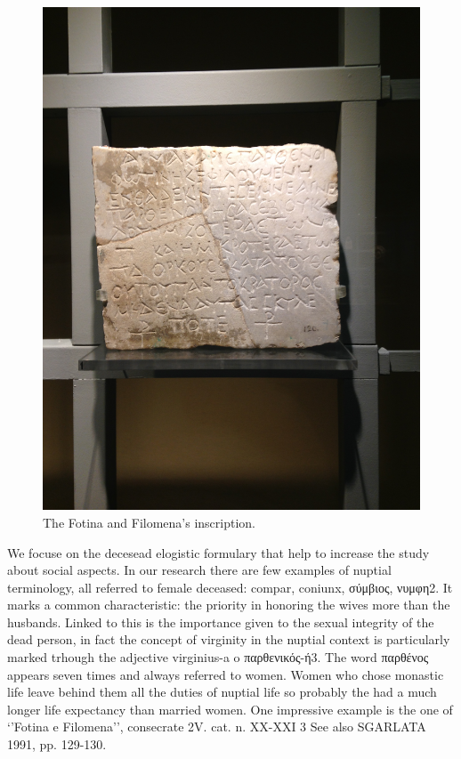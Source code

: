 \documentclass[amsthm,ebook]{saparticle}
\begin{document}
\begin{figure}[hbp]
\centering
 \includegraphics[width=\columnwidth]{Fotina e Filomena.JPG}
\caption{The Fotina and Filomena’s inscription.}
\label{fig:4}
\end{figure}


We focuse on the decesead elogistic formulary that help to increase the study about social aspects. In our research there are few examples of nuptial terminology, all referred to female deceased: compar, coniunx, σύμβιος, νυμφη2. It marks a common characteristic: the priority in honoring the wives more than the husbands. Linked to this is the importance given to the sexual integrity of the dead person, in fact the concept of virginity in the nuptial context is particularly marked trhough the adjective virginius-a o παρθενικός-ή3. The word παρθένος appears seven times and always referred to women. Women who chose monastic life leave behind them all the duties of nuptial life so probably the had a much longer life expectancy than married women. One impressive example is the one of ‘’Fotina e Filomena’’, consecrate
2V. cat. n. XX-XXI
3 See also SGARLATA 1991, pp. 129-130.
  
\end{document}
